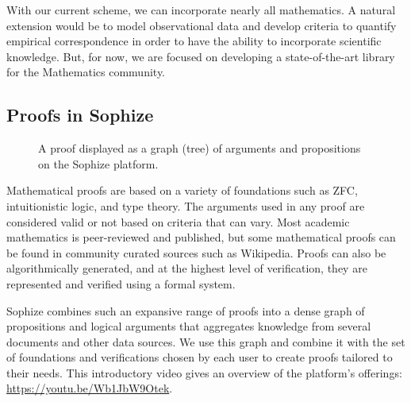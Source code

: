 \documentclass[runningheads]{llncs}
\begin{document}
With our current scheme, we can incorporate nearly all mathematics. A natural extension
would be to model observational data and develop criteria to quantify empirical
correspondence in order to have the ability to incorporate scientific knowledge. But, for
now, we are focused on developing a state-of-the-art library for the Mathematics community.

\subsection{Proofs in Sophize}
\label{sec:sophize_proofs}

\begin{figure}[!ht]
\begin{center}
\caption{A proof displayed as a graph (tree) of arguments and propositions on the Sophize platform.}
\label{proof_tree}
\end{center}
\end{figure}


Mathematical proofs are based on a variety of foundations such as ZFC, intuitionistic logic, and type theory. The arguments used in any proof are considered valid or not based on criteria that can vary. Most academic mathematics is peer-reviewed and published, but some mathematical proofs can be found in community curated sources such as Wikipedia. Proofs can also be algorithmically generated, and at the highest level of verification, they are represented and verified using a formal system. 

Sophize combines such an expansive range of proofs into a dense graph of propositions and logical arguments that aggregates knowledge from several documents and other data sources. We use this graph and combine it with the set of foundations and verifications chosen by each user to create proofs tailored to their needs. This introductory video gives an overview of the platform's offerings: \url{https://youtu.be/Wb1JbW9Otek}.
\end{document}

